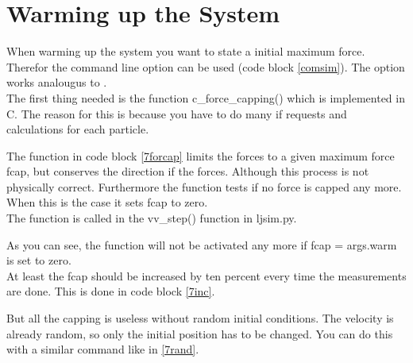 \section{Warming up the System}

When warming up the system you want to state a initial maximum force.
Therefor the command line option  can be used (code block \ref{comsim}).
The option  works analougus to .\\

The first thing needed is the function c\_force\_capping() which is implemented in C. 
The reason for this is because you have to do many if requests and calculations for each particle.


The function in code block \ref{7forcap} limits the forces to a given maximum force fcap, but conserves the direction if the forces. 
Although this process is not physically correct.
Furthermore the function tests if no force is capped any more. 
When this is the case it sets fcap to zero.\\

The function is called in the vv\_step() function in ljsim.py.


As you can see, the function will not be activated any more if fcap = args.warm is set to zero.\\

At least the fcap should be increased by ten percent every time the measurements are done. 
This is done in code block \ref{7inc}.


But all the capping is useless without random initial conditions. 
The velocity is already random, so only the initial position has to be changed. 
You can do this with a similar command like in \ref{7rand}.


